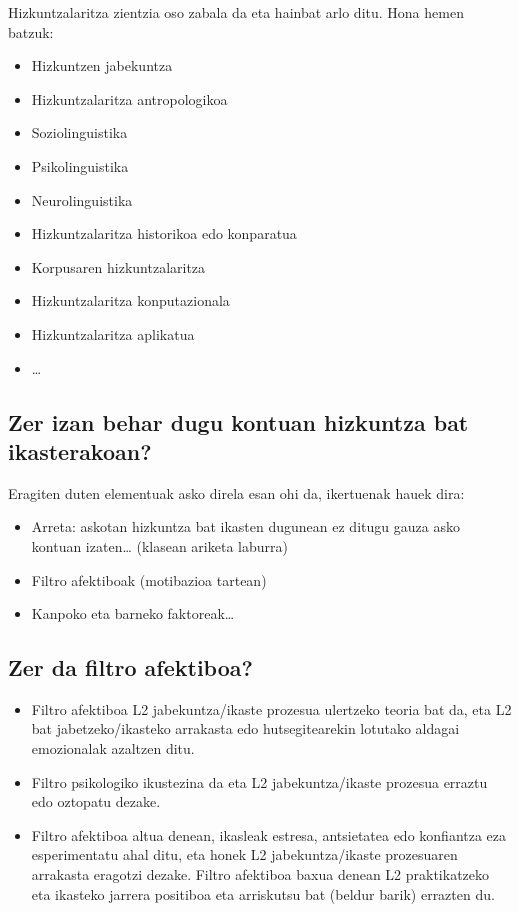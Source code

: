 \documentclass[
]{book}
\providecommand{\tightlist}{%
  \setlength{\itemsep}{0pt}\setlength{\parskip}{0pt}}
\begin{document}
Hizkuntzalaritza zientzia oso zabala da eta hainbat arlo ditu.
Hona hemen batzuk:

\begin{itemize}
\tightlist
\item
  Hizkuntzen jabekuntza
\item
  Hizkuntzalaritza antropologikoa
\item
  Soziolinguistika
\item
  Psikolinguistika
\item
  Neurolinguistika
\item
  Hizkuntzalaritza historikoa edo konparatua
\item
  Korpusaren hizkuntzalaritza
\item
  Hizkuntzalaritza konputazionala
\item
  Hizkuntzalaritza aplikatua
\item
  \ldots{}
\end{itemize}

\hypertarget{zer-izan-behar-dugu-kontuan-hizkuntza-bat-ikasterakoan}{%
\subsection{Zer izan behar dugu kontuan hizkuntza bat ikasterakoan?}\label{zer-izan-behar-dugu-kontuan-hizkuntza-bat-ikasterakoan}}

Eragiten duten elementuak asko direla esan ohi da, ikertuenak hauek dira:

\begin{itemize}
\tightlist
\item
  Arreta: askotan hizkuntza bat ikasten dugunean ez ditugu gauza
  asko kontuan izaten\ldots{} (klasean ariketa laburra)
\item
  Filtro afektiboak (motibazioa tartean)
\item
  Kanpoko eta barneko faktoreak\ldots{}
\end{itemize}

\hypertarget{zer-da-filtro-afektiboa}{%
\subsection{Zer da filtro afektiboa?}\label{zer-da-filtro-afektiboa}}

\begin{itemize}
\tightlist
\item
  Filtro afektiboa L2 jabekuntza/ikaste prozesua ulertzeko teoria bat da, eta L2 bat jabetzeko/ikasteko arrakasta edo hutsegitearekin lotutako aldagai emozionalak azaltzen ditu.
\item
  Filtro psikologiko ikustezina da eta L2 jabekuntza/ikaste prozesua erraztu edo oztopatu dezake.
\item
  Filtro afektiboa altua denean, ikasleak estresa, antsietatea edo konfiantza eza esperimentatu ahal ditu, eta honek L2 jabekuntza/ikaste prozesuaren arrakasta eragotzi dezake. Filtro afektiboa baxua denean L2 praktikatzeko eta ikasteko jarrera positiboa eta arriskutsu bat (beldur barik) errazten du.
\end{itemize}
\end{document}
